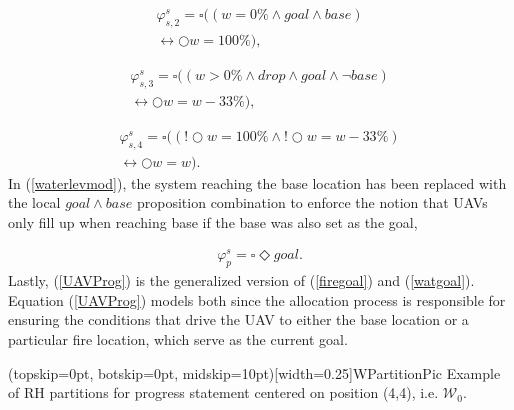\documentclass{ieeeaccess}
\newcommand{\always}{\square}
\newcommand{\eventually}{\Diamond}
\newcommand{\next}{\bigcirc}
\begin{document}
\begin{equation}
\begin{aligned}
\varphi_{s,2}^{s} = \always (( w = 0 \%  \land goal \land base) \\ \leftrightarrow \next w = 100\%),
\end{aligned}
\label{waterlevmod}
\end{equation}

\begin{equation}
\begin{aligned}
\varphi_{s,3}^{s} = \always (( w > 0 \%  \land drop \land goal \land \lnot base) \\ \leftrightarrow \next w = w - 33 \%),
\end{aligned}
\label{UAVWaterLevel}
\end{equation}

\begin{equation}
\begin{aligned}
\varphi_{s,4}^{s} = \always ((!\next w = 100\% \land !\next w = w - 33 \%) \\  \leftrightarrow \next w = w).
\end{aligned}
\label{UAVWaterLevel2}
\end{equation}
In (\ref{waterlevmod}), the system reaching the base location has been replaced with the local $goal \land base$ proposition combination to enforce the notion that UAVs only fill up when reaching base if the base was also set as the goal,

\begin{equation}
\begin{aligned}
\varphi_{p}^{s} = \always \eventually goal.
\end{aligned}
\label{UAVProg}
\end{equation}
Lastly, (\ref{UAVProg}) is the generalized version of (\ref{firegoal}) and (\ref{watgoal}). Equation (\ref{UAVProg}) models both since the allocation process is responsible for ensuring the conditions that drive the UAV to either the base location or a particular fire location, which serve as the current goal.

\Figure[t!](topskip=0pt, botskip=0pt, midskip=10pt)[width=0.25\textwidth]{WPartitionPic}
{Example of RH partitions for progress statement centered on position (4,4), i.e. $\mathcal{W}_0$.\label{WPart}}
\end{document}

